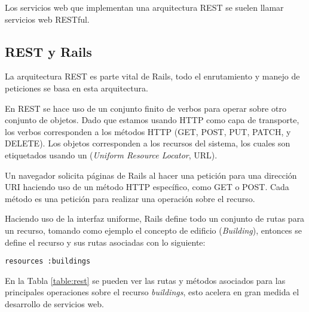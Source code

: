 Los servicios web que implementan una arquitectura REST se suelen llamar
servicios web RESTful.

\subsection{REST y Rails}

La arquitectura REST es parte vital de Rails, todo el enrutamiento y
manejo de peticiones se basa en esta arquitectura.

En REST se hace uso de un conjunto finito de verbos para operar sobre otro
conjunto de objetos. Dado que estamos usando HTTP como capa de transporte, los
verbos corresponden a los métodos HTTP (GET, POST, PUT, PATCH, y DELETE).
Los objetos corresponden a los recursos del sistema, los cuales son etiquetados
usando un (\textit{Uniform Resource Locator}, URL).

Un navegador solicita páginas de Rails al hacer una petición para una dirección URI
haciendo uso de un método HTTP específico, como GET o POST. Cada método es una
petición para realizar una operación sobre el recurso.

Haciendo uso de la interfaz uniforme, Rails define todo un conjunto de rutas
para un recurso, tomando como ejemplo el concepto de edificio (\textit{Building}),
entonces se define el recurso y sus rutas asociadas con lo siguiente:

\begin{verbatim}
resources :buildings
\end{verbatim}

En la Tabla \ref{table:rest} se pueden ver las rutas y métodos asociados para
las principales operaciones sobre el recurso \textit{buildings}, esto acelera
en gran medida el desarrollo de servicios web.


